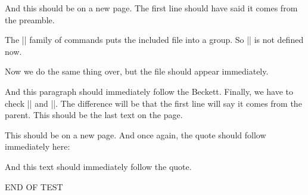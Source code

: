 
\checkp

And this should be on a new page.  The first line should have said it
comes from the preamble. 

The || family of commands puts the included file into a group.  So
|\preamblecmd| is not defined now.

Now we do the same thing over, but the file should appear immediately.  


\checkp

And this paragraph should immediately follow the Beckett.  Finally, we have to
check || and ||.  The difference will be that
the first line will say it comes from the parent.  This should be the last text
on the page.

\newcommand\preamblecmd {%
  This def of preamblecmd comes from the parent.
}


\checkp
This should be on a new page.  And once again, the quote should follow
immediately here:


\checkp

And this text should immediately follow the quote. 


END OF TEST



